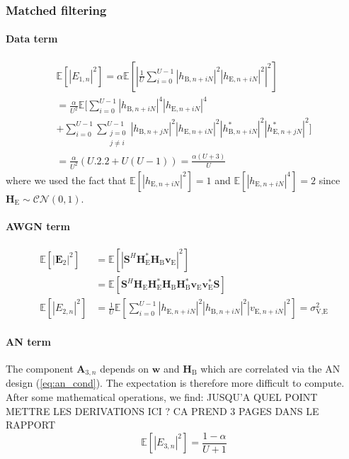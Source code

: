 \documentclass[journal,comsoc]{IEEEtran}
\newcommand{\module}[1]{\left|#1\right|}
\newcommand{\EX}[1]{\mathbb{E} \left[#1\right]}%
\newcommand{\HE}{\textbf{H}_{\text{E}}}
\newcommand{\HB}{\textbf{H}_{\text{B}}}
\newcommand{\ve}{\textbf{v}_{\text{E}}}
\newcommand{\spread}{\textbf{S}}
\begin{document}
\subsubsection{Matched filtering}\label{sec:matched-filtering-app}
\paragraph{Data term}\label{sec:data-term-app-2}
\begin{multline}
	\EX{|E_{1,n}|^2} = \alpha \EX{\left|\frac{1}{U}\sum_{i=0}^{U-1} \left| h_{\text{B}, n + iN}\right|^2 \left| h_{\text{E}, n + iN}\right|^2\right|^2} \\
	=\frac{\alpha}{U^2} \mathbb{E} \Bigg[\sum_{i=0}^{U-1} \left| h_{\text{B}, n + iN}\right|^4 \left| h_{\text{E}, n + iN}\right|^4 \\
	+ \sum_{i=0}^{U-1}\sum_{\substack{j=0 \\ j\neq i}}^{U-1}  \left| h_{\text{B}, n + jN}\right|^2 \left| h_{\text{E}, n + iN}\right|^2 \left| h^*_{\text{B}, n + iN}\right|^2 \left| h^*_{\text{E}, n + jN}\right|^2 \Bigg] \\
	= \frac{\alpha}{U^2} \left(U.2.2 + U(U-1) \right) = \frac{\alpha (U+3)}{U}
	\label{eq:data_eve_filt1-app}
\end{multline}
where we used the fact that $\EX{\left| h_{\text{E}, n + iN}\right|^2} = 1$ and $\EX{\left| h_{\text{E}, n + iN}\right|^4} = 2$ since $\HE \sim \mathcal{CN}(0,1)$.



\paragraph{AWGN term}\label{sec:awgn-term-app-2}
\begin{equation}
	\begin{split}
		\EX{|\textbf{E}_{2}|^2} &=  \EX{\module{\spread^H \HE^* \HB \ve}^2} \\
		&=\EX{\spread^H   \HE \HE^* \HB\HB^*  \ve \ve^* \spread } \\
		\EX{|E_{2,n}|^2} &= \frac{1}{U} \EX{\sum_{i=0}^{U-1} |h_{\text{E}, n + iN}|^2 |h_{\text{B}, n + iN}|^2 |v_{\text{E}, n + iN}|^2} = \sigma^2_{\text{V,E}}
	\end{split}
	\label{eq:noise_eve_filt1-app}
\end{equation}

\paragraph{AN term}\label{sec:an-term-app-2}
The component $\textbf{A}_{3,n}$ depends on $\textbf{w}$ and $\HB$ which are correlated via the AN design (\ref{eq:an_cond}). The expectation is therefore more difficult to compute. After some mathematical operations, we find: {\color{red} JUSQU'A QUEL POINT METTRE LES DERIVATIONS ICI ? CA PREND 3 PAGES DANS LE RAPPORT}
\begin{equation}
	\EX{|E_{3,n}|^2} = \frac{1-\alpha}{U+1}
	\label{eq:an_eve_filt1-app}
\end{equation}
\end{document}

